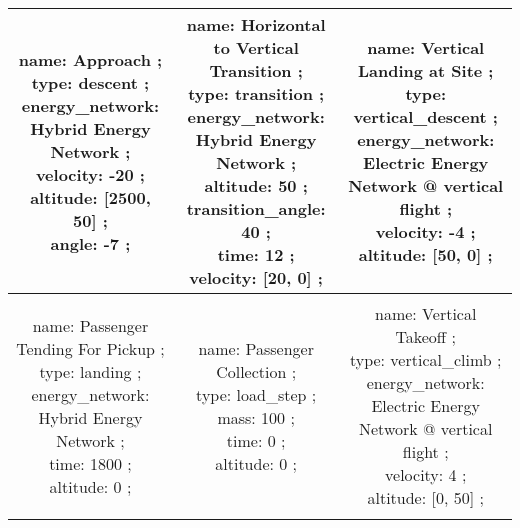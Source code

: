 \begin{table}[h]
\begin{adjustbox}{width=1\textwidth}
\begin{tabular}{|c|c|c|}
\makecell{name: Approach ; \\ type: descent ; \\ energy\_network: Hybrid Energy Network ; \\ velocity: -20 ; \\ altitude: [2500, 50] ; \\ angle: -7 ; \\ } & \makecell{name: Horizontal to Vertical Transition ; \\ type: transition ; \\ energy\_network: Hybrid Energy Network ; \\ altitude: 50 ; \\ transition\_angle: 40 ; \\ time: 12 ; \\ velocity: [20, 0] ; \\ } & \makecell{name: Vertical Landing at Site ; \\ type: vertical\_descent ; \\ energy\_network: Electric Energy Network @ vertical flight ; \\ velocity: -4 ; \\ altitude: [50, 0] ; \\ }\\ \hline \\ 
\makecell{name: Passenger Tending For Pickup ; \\ type: landing ; \\ energy\_network: Hybrid Energy Network ; \\ time: 1800 ; \\ altitude: 0 ; \\ } & \makecell{name: Passenger Collection ; \\ type: load\_step ; \\ mass: 100 ; \\ time: 0 ; \\ altitude: 0 ; \\ } & \makecell{name: Vertical Takeoff ; \\ type: vertical\_climb ; \\ energy\_network: Electric Energy Network @ vertical flight ; \\ velocity: 4 ; \\ altitude: [0, 50] ; \\ }\\ \hline \\ 

\end{tabular}
\end{adjustbox}
\end{table}
